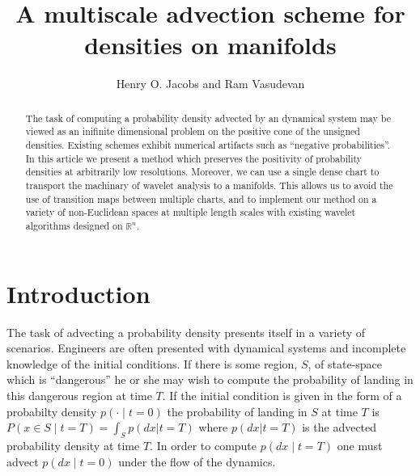\documentclass[letterpaper, 12 pt]{amsart}
\title{
  A 
  multiscale
  advection scheme for
  densities on manifolds
}
\author{Henry O. Jacobs and Ram Vasudevan}%
\newcommand{\R}{\mathbb{R}}
\begin{document}
\maketitle

\begin{abstract}
  The task of computing a probability density advected by an 
  dynamical system may be viewed as an inifinite dimensional problem
  on the positive cone of the unsigned densities.
  Existing schemes exhibit numerical artifacts such as
  ``negative probabilities''.
  In this article we present a method
  which preserves the positivity of probability densities
  at arbitrarily low resolutions.
  Moreover, we can use a single dense chart to transport the machinary of wavelet analysis to a manifolds.
  This allows us to avoid the use of transition maps between multiple charts, and to implement our method on a variety of non-Euclidean spaces at multiple length scales with existing wavelet algorithms designed on $\R^n$.
\end{abstract}


\section{Introduction}
  The task of advecting a probability density presents itself
  in a variety of scenarios.
  Engineers are often presented
  with dynamical systems and incomplete knowledge
  of the initial conditions.
  If there is some region, $S$, of state-space which is ``dangerous''
  he or she may wish to compute the probability of landing
  in this dangerous region at time $T$.
  If the initial condition is given in the form of a
  probabilty density $p(\cdot \mid t=0)$
  the probability of landing in $S$ at time $T$
  is $P( x \in S \mid t = T)  = \int_S p( dx | t=T )$
  where $p(dx|t=T)$ is the advected probability density at time $T$.
  In order to compute $p(dx\mid t=T)$
  one must advect $p(dx\mid t=0)$ under the flow of the dynamics.
\end{document}
